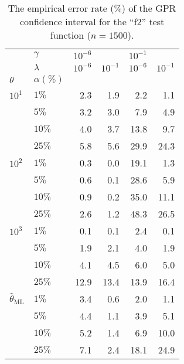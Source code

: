 \documentclass[conference]{IEEEtran}
\begin{document}
\begin{table}
  \centering
  \caption{The empirical error rate ($\%$) of the GPR confidence interval for the
  ``f2'' test function ($n=1500$).}
  \label{tab:nongaussian_f2_2d_cov_gpr}
  \begin{tabular}{ll||rrrr}
  \toprule
       & $\gamma$ & $10^{-6}$ &          & $10^{-1}$ &          \\\cline{2-2}
       & $\lambda$ & $10^{-6}$ & $10^{-1}$ & $10^{-6}$ & $10^{-1}$ \\\cline{2-2}
  $\theta$ & $\alpha(\%)$ &          &          &          &          \\
  \midrule
   $10^1$ & $1\%$ &      2.3 &      1.9 &      2.2 &      1.1 \\
        & $5\%$ &      3.2 &      3.0 &      7.9 &      4.9 \\
        & $10\%$ &      4.0 &      3.7 &     13.8 &      9.7 \\
        & $25\%$ &      5.8 &      5.6 &     29.9 &     24.3 \\
  \midrule
   $10^2$ & $1\%$ &      0.3 &      0.0 &     19.1 &      1.3 \\
        & $5\%$ &      0.6 &      0.1 &     28.6 &      5.9 \\
        & $10\%$ &      0.9 &      0.2 &     35.0 &     11.1 \\
        & $25\%$ &      2.6 &      1.2 &     48.3 &     26.5 \\
  \midrule
   $10^3$ & $1\%$ &      0.1 &      0.1 &      2.4 &      0.1 \\
        & $5\%$ &      1.9 &      2.1 &      4.0 &      1.9 \\
        & $10\%$ &      4.1 &      4.5 &      6.0 &      5.0 \\
        & $25\%$ &     12.9 &     13.4 &     13.9 &     16.4 \\
  \midrule
   $\hat{\theta}_\text{ML}$ & $1\%$ &      3.4 &      0.6 &      2.0 &      1.1 \\
        & $5\%$ &      4.4 &      1.1 &      3.9 &      5.1 \\
        & $10\%$ &      5.2 &      1.4 &      6.9 &     10.0 \\
        & $25\%$ &      7.1 &      2.4 &     18.1 &     24.9 \\
  \bottomrule
  \end{tabular}
\end{table}

\end{document}

